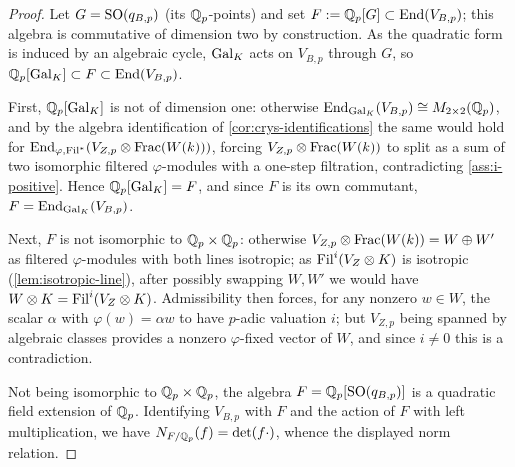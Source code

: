 \begin{proof}
  Let \(G = \mathrm{SO}(q_{B,p})\) (its \(\mathbb{Q}_p\)-points) and set \(F := \mathbb{Q}_p[G] \subset
  \mathrm{End}(V_{B,p})\); this algebra is commutative of dimension two by construction.
  As the quadratic form is induced by an algebraic cycle, \(\mathrm{Gal}_K\) acts on
  \(V_{B,p}\) through \(G\), so
  \(\mathbb{Q}_p[\mathrm{Gal}_K] \subset F \subset \mathrm{End}(V_{B,p})\).

  First, \(\mathbb{Q}_p[\mathrm{Gal}_K]\) is not of dimension one: otherwise
  \(\mathrm{End}_{\mathrm{Gal}_K}(V_{B,p}) \cong M_{2\times 2}(\mathbb{Q}_p)\), and by the algebra
  identification of \cref{cor:crys-identifications} the same would hold for
  \(\mathrm{End}_{\varphi,\mathrm{Fil}^*}(V_{Z,p} \otimes \mathrm{Frac}(W(k)))\), forcing
  \(V_{Z,p} \otimes \mathrm{Frac}(W(k))\) to split as a sum of two isomorphic filtered
  \(\varphi\)-modules with a one-step filtration, contradicting
  \cref{ass:i-positive}. Hence \(\mathbb{Q}_p[\mathrm{Gal}_K] = F\), and since \(F\) is its own
  commutant, \(F = \mathrm{End}_{\mathrm{Gal}_K}(V_{B,p})\).

  Next, \(F\) is not isomorphic to \(\mathbb{Q}_p \times \mathbb{Q}_p\): otherwise
  \(V_{Z,p} \otimes \mathrm{Frac}(W(k)) = W \oplus W'\) as filtered \(\varphi\)-modules
  with both lines isotropic; as \(\mathrm{Fil}^i(V_Z \otimes K)\) is isotropic
  (\cref{lem:isotropic-line}), after possibly swapping \(W, W'\) we would have
  \(W \otimes K = \mathrm{Fil}^i(V_Z \otimes K)\). Admissibility then forces, for any
  nonzero \(w \in W\), the scalar \(\alpha\) with \(\varphi(w) = \alpha w\) to
  have \(p\)-adic valuation \(i\); but \(V_{Z,p}\) being spanned by algebraic
  classes provides a nonzero \(\varphi\)-fixed vector of \(W\), and since
  \(i \neq 0\) this is a contradiction.

  Not being isomorphic to \(\mathbb{Q}_p \times \mathbb{Q}_p\), the algebra \(F = \mathbb{Q}_p[\mathrm{SO}(q_{B,p})]\)
  is a quadratic field extension of \(\mathbb{Q}_p\). Identifying \(V_{B,p}\) with \(F\)
  and the action of \(F\) with left multiplication, we have
  \(N_{F/\mathbb{Q}_p}(f) = \det(f \cdot)\), whence the displayed norm relation.
\end{proof}

